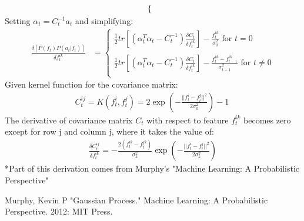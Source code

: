 \documentclass[12pt]{article}
\newcommand{\tr}{tr}
\begin{document}
\begin{enumerate}
\begin{align*}
\begin{cases}
 \end{cases}
\end{align*}
\vspace{5mm}
Setting $\alpha_t = C_t^{-1} a_t$ and simplifying:
\begin{align*}
\frac{\delta [P(f_t)P(a_t|f_t)]}{\delta f_{t}^{ik}}&=\begin{cases}
\frac12\tr[(\alpha_t^T\alpha_t-C_t^{-1})\frac{\delta C_t}{\delta f_{t}^{ik}}]-\frac{f_{t}^{ik}}{\sigma_0^2}\text{ for } t=0\\
\\
 \frac12\tr[(\alpha_t^T\alpha_t-C_t^{-1})\frac{\delta C_t}{\delta f_{t}^{ik}}]-\frac{f_{t}^{ik}-f_{t-1}^{ik}}{\sigma_{t-1}^2} \text{ for } t\neq0\\
 \end{cases}
\end{align*}
\vspace{5mm}
Given kernel function for the covariance matrix:
\begin{align*}
C_t^{ij}=K(f_t^i,f_t^j)=2 \exp(-\frac{||f_t^i-f_t^j||^2}{2\sigma_k^2})-1 \
\end{align*}
The derivative of covariance matrix $C_t$ with respect to feature $f_t^{ik}$ becomes zero except for row j and column j, where it takes the value of:
\begin{align*}
\frac{\delta C_{t}^{ij}}{\delta f_{t}^{ik}} = -\frac{2(f_{t}^{ik}-f_{t}^{jk})}{\sigma_k^2}\exp(-\frac{||f_{t}^i-f_{t}^j||^2}{2\sigma_k^2})
\end{align*}
*Part of this derivation comes from Murphy's "Machine Learning: A Probabilistic Perspective" \cite{murphy}


\newpage
\begin{thebibliography}{1}
 Murphy, Kevin P "Gaussian Process." Machine Learning: A Probabilistic Perspective. 2012: MIT Press.
\end{thebibliography}
\end{enumerate}
\end{document}
